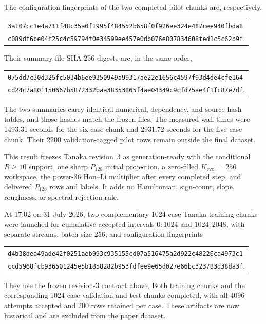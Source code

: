 \documentclass[11pt]{article}
\begin{document}
The configuration fingerprints of the two completed pilot chunks are,
respectively,
\begin{center}
\footnotesize
\begin{tabular}{@{}l@{}}
\texttt{3a107cc1e4a711f48c35a0f1995f484552b658f0f926ee324e487cee940fbda8}\\
\texttt{c089df6be04f25c4c59794f0e34599ee457e0db076e807834608fed1c5c62b9f}.
\end{tabular}
\end{center}
Their summary-file SHA-256 digests are, in the same order,
\begin{center}
\footnotesize
\begin{tabular}{@{}l@{}}
\texttt{075dd7c30d325fc5034b6ee9350949a99317ae22e1656c4597f93d4de4cfe164}\\
\texttt{cd24c7a801150667b5872332baa38353865f4ae04349c9cfd75ae4f1fc87e7df}.
\end{tabular}
\end{center}
The two summaries carry identical numerical, dependency, and source-hash
tables, and those hashes match the frozen files.  The measured wall times were
1493.31 seconds for the six-case chunk and 2931.72 seconds for the five-case
chunk.  Their 2200 validation-tagged pilot rows remain outside the final
dataset.

This result freezes Tanaka revision~3 as generation-ready with the conditional
$R\geq10$ support, one sharp $P_{128}$ initial projection, a zero-filled
$K_{\mathrm{evol}}=256$ workspace, the power-36 Hou--Li multiplier after every
completed step, and delivered $P_{128}$ rows and labels.  It adds no
Hamiltonian, sign-count, slope, roughness, or spectral rejection rule.

At 17:02 on 31 July 2026, two complementary 1024-case Tanaka training chunks
were launched for cumulative accepted intervals $0{:}1024$ and
$1024{:}2048$, with separate streams, batch size 256, and configuration
fingerprints
\begin{center}
\footnotesize
\begin{tabular}{@{}l@{}}
\texttt{d4b38dea49ade42f0251aeb993c935155cd07a516475a2d922c48226ca4973c1}\\
\texttt{ccd5968fcb936501245e5b1858282b953fdfee9e65d027e66bc323783d38da3f}.
\end{tabular}
\end{center}
They use the frozen revision-3 contract above.  Both training chunks and the
corresponding 1024-case validation and test chunks completed, with all 4096
attempts accepted and 200 rows retained per case.  These artifacts are now
historical and are excluded from the paper dataset.
\end{document}
